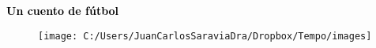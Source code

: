 \documentclass[a4paper,12pt]{extbook}
\date{}%
\author{%
    \textbf{Juan Carlos Saravia}\\
    }
\makeatletter
\def\printauthor{%
    {\large\@author}}
\makeatother
\begin{document}
\hypersetup{pageanchor=false}

\begin{titlepage}
\vspace*{0.1\textheight}
\noindent
\center
\textcolor{black}{\LARGE\textbf{\textsf{Un cuento de fútbol}}}
\vspace*{0.5cm}\par
\noindent
{\LARGE\itshape \printauthor\par}
\vfill

\begin{figure}[ht]

\centering
\texttt{[image: C:/Users/JuanCarlosSaraviaDra/Dropbox/Tempo/images]}
\caption{}
\end{figure}


\end{titlepage}
\restoregeometry




%
%

\clearpage
\hypersetup{pageanchor=true}


%






%
%
%
%
%


%
%
%
%

\end{document}
